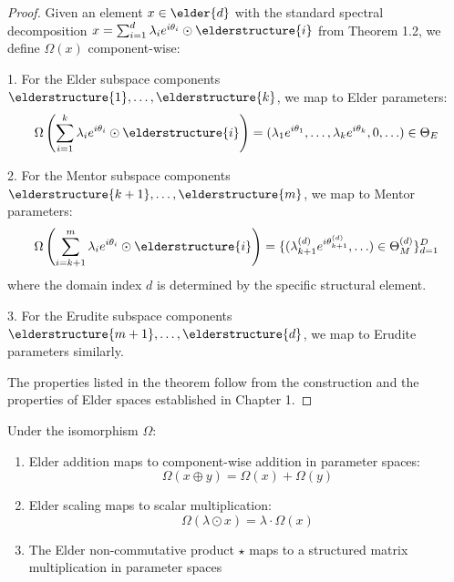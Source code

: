 \begin{proof}
Given an element $x \in \elder{d}$ with the standard spectral decomposition $x = \sum_{i=1}^{d} \lambda_i e^{i\theta_i} \odot \elderstructure{i}$ from Theorem 1.2, we define $\Omega(x)$ component-wise:

1. For the Elder subspace components $\elderstructure{1}, \ldots, \elderstructure{k}$, we map to Elder parameters:
\begin{equation}
\Omega\left(\sum_{i=1}^{k} \lambda_i e^{i\theta_i} \odot \elderstructure{i}\right) = (\lambda_1 e^{i\theta_1}, \ldots, \lambda_k e^{i\theta_k}, 0, \ldots) \in \Theta_E
\end{equation}

2. For the Mentor subspace components $\elderstructure{k+1}, \ldots, \elderstructure{m}$, we map to Mentor parameters:
\begin{equation}
\Omega\left(\sum_{i=k+1}^{m} \lambda_i e^{i\theta_i} \odot \elderstructure{i}\right) = \{(\lambda_{k+1}^{(d)} e^{i\theta_{k+1}^{(d)}}, \ldots) \in \Theta_M^{(d)}\}_{d=1}^D
\end{equation}
where the domain index $d$ is determined by the specific structural element.

3. For the Erudite subspace components $\elderstructure{m+1}, \ldots, \elderstructure{d}$, we map to Erudite parameters similarly.

The properties listed in the theorem follow from the construction and the properties of Elder spaces established in Chapter 1.
\end{proof}

\begin{corollary}
\label{cor:operation_preservation}
Under the isomorphism $\Omega$:
\begin{enumerate}
    \item Elder addition maps to component-wise addition in parameter spaces:
    \begin{equation}
    \Omega(x \oplus y) = \Omega(x) + \Omega(y)
    \end{equation}
    
    \item Elder scaling maps to scalar multiplication:
    \begin{equation}
    \Omega(\lambda \odot x) = \lambda \cdot \Omega(x)
    \end{equation}
    
    \item The Elder non-commutative product $\star$ maps to a structured matrix multiplication in parameter spaces
\end{enumerate}
\end{corollary}


